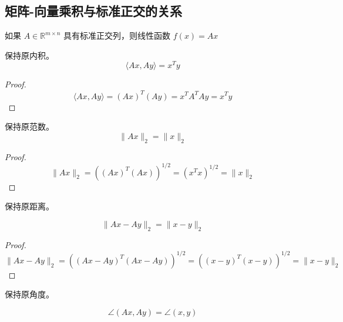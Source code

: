 \subsection{矩阵-向量乘积与标准正交的关系}

如果 $ A \in \mathbb{R}^{m \times n} $ 具有标准正交列，则线性函数 $ f(x)=A x $

\begin{theorem}
    保持原内积。
    \begin{equation} \langle A x, A y\rangle=x^{T} y \end{equation}
\end{theorem}

\begin{proof}
    \begin{equation} \langle A x, A y\rangle=(A x)^{T}(A y)=x^{T} A^{T} A y=x^{T} y \end{equation}
\end{proof}


\begin{theorem}
    保持原范数。
    \begin{equation}
    \|A x\|_{2}=\|x\|_{2}
    \end{equation}
\end{theorem}

\begin{proof}
   \begin{equation}
\|A x\|_{2}=\left((A x)^{T}(A x)\right)^{1 / 2}=\left(x^{T} x\right)^{1 / 2}=\|x\|_{2}
\end{equation}
\end{proof}

\begin{theorem}
    保持原距离。

    \begin{equation}
    \|A x-A y\|_{2}=\|x-y\|_{2}
    \end{equation}
\end{theorem}

\begin{proof}
   \begin{equation}
\|A x-A y\|_{2}=\left((A x-A y)^{T}(A x-A y)\right)^{1 / 2}=\left((x-y)^{T}(x-y)\right)^{1 / 2}=\|x-y\|_{2}
\end{equation}
\end{proof}

\begin{theorem}
    保持原角度。

    \begin{equation} \angle(A x, A y)=\angle(x, y) \end{equation}
\end{theorem}

